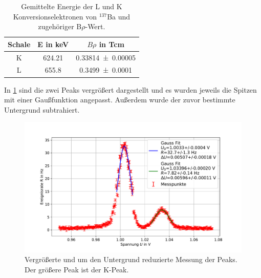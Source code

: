 \documentclass[
	a4paper,
	12pt,
	pagesize,
	ngerman
]{scrartcl}
\begin{document}
\begin{table}[H]
		\centering
		\begin{tabular}{c | c | c  }
			 Schale&E in \si{keV} & $B\rho$ in \si{Tcm} \\ \hline
			 K & \SI{624.21}{} & \SI{0.33814(5)}{} \\
			 L & \SI{655.8}{} & \SI{0.3499(1)}{} \\
		\end{tabular}
		\caption{
		Gemittelte Energie der L und K Konversionselektronen von $^{137}$Ba und zugehöriger B$\rho$-Wert. \cite{Anleitung}
		}
		\label{tb_konversion}
\end{table}
In \cref{fg_kalibration} sind die zwei Peaks vergrößert dargestellt und es wurden jeweils die Spitzen mit einer Gaußfunktion angepasst.
Außerdem wurde der zuvor bestimmte Untergrund subtrahiert.
	\begin{figure}[H]
			\includegraphics[width=  \linewidth]{img/kalibration}
			\caption{
			Vergrößerte und um den Untergrund reduzierte Messung der Peaks.
			Der größere Peak ist der K-Peak.
			}
			\label{fg_kalibration}
	\end{figure}
\end{document}
